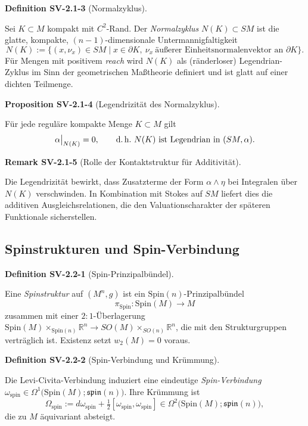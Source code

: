 \documentclass[10pt, letterpaper]{article}
\newcommand{\CustomHeading}[3]{%
  \par\medskip\noindent%
  \textbf{#1 #2} \textnormal{(#3)}.\enskip%
}
\newenvironment{DEF}[2]{\begin{unitbox}\CustomHeading{Definition}{#1}{#2}}{\end{unitbox}}
\newenvironment{PROP}[2]{\begin{unitbox}\CustomHeading{Proposition}{#1}{#2}}{\end{unitbox}}
\newenvironment{REM}[2]{\begin{unitbox}\CustomHeading{Remark}{#1}{#2}}{\end{unitbox}}
\begin{document}
\begin{DEF}{SV-2.1-3}{Normalzyklus}
Sei $K\subset M$ kompakt mit $C^2$-Rand. Der \emph{Normalzyklus} $N(K)\subset SM$ ist die glatte, kompakte, $(n{-}1)$-dimensionale Untermannigfaltigkeit
\[
N(K):=\{(x,\nu_x)\in SM\mid x\in \partial K,\ \nu_x\ \text{äußerer Einheitsnormalenvektor an }\partial K\}.
\]
Für Mengen mit positivem \emph{reach} wird $N(K)$ als (ränderloser) Legendrian-Zyklus im Sinn der geometrischen Maßtheorie definiert und ist glatt auf einer dichten Teilmenge.
\end{DEF}

\begin{PROP}{SV-2.1-4}{Legendrizität des Normalzyklus}
Für jede reguläre kompakte Menge $K\subset M$ gilt
\[
\alpha\big|_{N(K)}=0,\qquad \text{d.\,h.\ } N(K)\ \text{ist Legendrian in }(SM,\alpha).
\]
\end{PROP}

\begin{REM}{SV-2.1-5}{Rolle der Kontaktstruktur für Additivität}
Die Legendrizität bewirkt, dass Zusatzterme der Form $\alpha\wedge\eta$ bei Integralen über $N(K)$ verschwinden. In Kombination mit Stokes auf $SM$ liefert dies die additiven Ausgleichsrelationen, die den Valuationscharakter der späteren Funktionale sicherstellen.
\end{REM}


\subsection{Spinstrukturen und Spin-Verbindung}\label{subsec:SV-2.2}

\begin{DEF}{SV-2.2-1}{Spin-Prinzipalbündel}
Eine \emph{Spinstruktur} auf $(M^n,g)$ ist ein $\mathrm{Spin}(n)$-Prinzipalbündel
\[
\pi_{\mathrm{Spin}}:\mathrm{Spin}(M)\to M
\]
zusammen mit einer $2{:}1$-Überlagerung $\mathrm{Spin}(M)\!\times_{\mathrm{Spin}(n)}\!\mathbb R^n \to SO(M)\!\times_{SO(n)}\!\mathbb R^n$, die mit den Strukturgruppen verträglich ist. Existenz setzt $w_2(M)=0$ voraus.
\end{DEF}

\begin{DEF}{SV-2.2-2}{Spin-Verbindung und Krümmung}
Die Levi-Civita-Verbindung induziert eine eindeutige \emph{Spin-Verbindung}
$\omega_{\mathrm{spin}}\in \Omega^1\big(\mathrm{Spin}(M);\mathfrak{spin}(n)\big)$.
Ihre Krümmung ist
\[
\Omega_{\mathrm{spin}}:=d\omega_{\mathrm{spin}}+\tfrac12[\omega_{\mathrm{spin}}\!,\omega_{\mathrm{spin}}]\in
\Omega^2\big(\mathrm{Spin}(M);\mathfrak{spin}(n)\big),
\]
die zu $M$ äquivariant absteigt.
\end{DEF}
\end{document}
